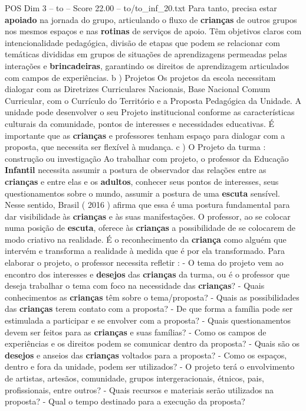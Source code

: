 \begin{textsample}{POS Dim 3 – to – Score 22.00 – to/to\_inf\_20.txt}
Para tanto, precisa estar \textbf{apoiado} na jornada do grupo, articulando o fluxo de \textbf{crianças} de outros grupos nos mesmos espaços e nas \textbf{rotinas} de serviços de apoio.
Têm objetivos claros com intencionalidade pedagógica, divisão de etapas que podem se relacionar com temáticas divididas em grupos de situações de aprendizagens permeadas pelas interações e \textbf{brincadeiras}, garantindo os direitos de aprendizagem articulados com campos de experiências. b ) Projetos Os projetos da escola necessitam dialogar com as Diretrizes Curriculares Nacionais, Base Nacional Comum Curricular, com o Currículo do Território e a Proposta Pedagógica da Unidade.
A unidade pode desenvolver o seu Projeto institucional conforme as características culturais da comunidade, pontos de interesses e necessidades educativas.
É importante que as \textbf{crianças} e professores tenham espaço para dialogar com a proposta, que necessita ser flexível à mudança. c ) O Projeto da turma : construção ou investigação Ao trabalhar com projeto, o professor da Educação \textbf{Infantil} necessita assumir a postura de observador das relações entre as \textbf{crianças} e entre elas e os \textbf{adultos}, conhecer seus pontos de interesses, seus questionamentos sobre o mundo, assumir a postura de uma \textbf{escuta} sensível.
Nesse sentido, Brasil ( 2016 ) afirma que essa é uma postura fundamental para dar visibilidade às \textbf{crianças} e às suas manifestações.
O professor, ao se colocar numa posição de \textbf{escuta}, oferece às \textbf{crianças} a possibilidade de se colocarem de modo criativo na realidade.
É o reconhecimento da \textbf{criança} como alguém que intervém e transforma a realidade à medida que é por ela transformado.
Para elaborar o projeto, o professor necessita refletir : - O tema do projeto vem ao encontro dos interesses e \textbf{desejos} das \textbf{crianças} da turma, ou é o professor que deseja trabalhar o tema com foco na necessidade das \textbf{crianças}? - Quais conhecimentos as \textbf{crianças} têm sobre o tema/proposta? - Quais as possibilidades das \textbf{crianças} terem contato com a proposta? - De que forma a família pode ser estimulada a participar e se envolver com a proposta? - Quais questionamentos devem ser feitos para as \textbf{crianças} e suas famílias? - Como os campos de experiências e os direitos podem se comunicar dentro da proposta? - Quais são os \textbf{desejos} e anseios das \textbf{crianças} voltados para a proposta? - Como os espaços, dentro e fora da unidade, podem ser utilizados? - O projeto terá o envolvimento de artistas, artesãos, comunidade, grupos intergeracionais, étnicos, pais, profissionais, entre outros? - Quais recursos e materiais serão utilizados na proposta? - Qual o tempo destinado para a execução da proposta?

\end{textsample}
